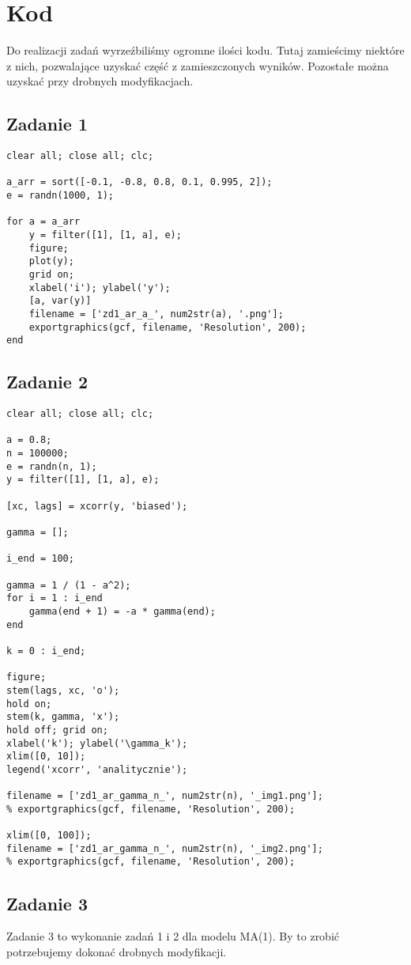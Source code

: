 \documentclass[11pt, a4paper]{article}
\begin{document}
\clearpage
\newpage

\section*{Kod}
Do realizacji zadań wyrzeźbiliśmy ogromne ilości kodu. Tutaj zamieścimy niektóre z nich, pozwalające uzyskać
część z zamieszczonych wyników. Pozostałe można uzyskać przy drobnych modyfikacjach.

\subsection*{Zadanie 1}
\begin{lstlisting}
clear all; close all; clc;

a_arr = sort([-0.1, -0.8, 0.8, 0.1, 0.995, 2]);
e = randn(1000, 1);

for a = a_arr
    y = filter([1], [1, a], e);
    figure;
    plot(y);
    grid on;
    xlabel('i'); ylabel('y');
    [a, var(y)]
    filename = ['zd1_ar_a_', num2str(a), '.png'];
    exportgraphics(gcf, filename, 'Resolution', 200);
end
\end{lstlisting}

\subsection*{Zadanie 2}
\begin{lstlisting}
clear all; close all; clc;

a = 0.8;
n = 100000;
e = randn(n, 1);
y = filter([1], [1, a], e);

[xc, lags] = xcorr(y, 'biased');

gamma = [];

i_end = 100;

gamma = 1 / (1 - a^2);
for i = 1 : i_end
    gamma(end + 1) = -a * gamma(end);
end

k = 0 : i_end;

figure;
stem(lags, xc, 'o');
hold on;
stem(k, gamma, 'x');
hold off; grid on;
xlabel('k'); ylabel('\gamma_k');
xlim([0, 10]);
legend('xcorr', 'analitycznie');

filename = ['zd1_ar_gamma_n_', num2str(n), '_img1.png'];
% exportgraphics(gcf, filename, 'Resolution', 200);

xlim([0, 100]);
filename = ['zd1_ar_gamma_n_', num2str(n), '_img2.png'];
% exportgraphics(gcf, filename, 'Resolution', 200);
\end{lstlisting}

\subsection*{Zadanie 3}
Zadanie 3 to wykonanie zadań 1 i 2 dla modelu MA(1). By to zrobić potrzebujemy dokonać drobnych modyfikacji.
\end{document}
